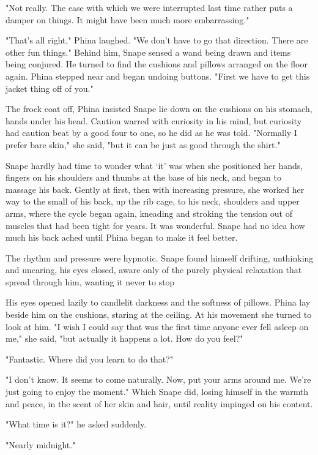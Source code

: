 "Not really. The ease with which we were interrupted last time rather puts a damper on things. It might have been much more embarrassing."

"That's all right," Phina laughed. "We don't have to go that direction. There are other fun things." Behind him, Snape sensed a wand being drawn and items being conjured. He turned to find the cushions and pillows arranged on the floor again. Phina stepped near and began undoing buttons. "First we have to get this jacket thing off of you."

The frock coat off, Phina insisted Snape lie down on the cushions on his stomach, hands under his head. Caution warred with curiosity in his mind, but curiosity had caution beat by a good four to one, so he did as he was told. "Normally I prefer bare skin," she said, "but it can be just as good through the shirt."

Snape hardly had time to wonder what `it' was when she positioned her hands, fingers on his shoulders and thumbs at the base of his neck, and began to massage his back. Gently at first, then with increasing pressure, she worked her way to the small of his back, up the rib cage, to his neck, shoulders and upper arms, where the cycle began again, kneading and stroking the tension out of muscles that had been tight for years. It was wonderful. Snape had no idea how much his back ached until Phina began to make it feel better.

The rhythm and pressure were hypnotic. Snape found himself drifting, unthinking and uncaring, his eyes closed, aware only of the purely physical relaxation that spread through him, wanting it never to stop{\el}

His eyes opened lazily to candlelit darkness and the softness of pillows. Phina lay beside him on the cushions, staring at the ceiling. At his movement she turned to look at him. "I wish I could say that was the first time anyone ever fell asleep on me," she said, "but actually it happens a lot. How do you feel?"

"Fantastic. Where did you learn to do that?"

"I don't know. It seems to come naturally. Now, put your arms around me. We're just going to enjoy the moment." Which Snape did, losing himself in the warmth and peace, in the scent of her skin and hair, until reality impinged on his content.

"What time is it?" he asked suddenly.

"Nearly midnight."

